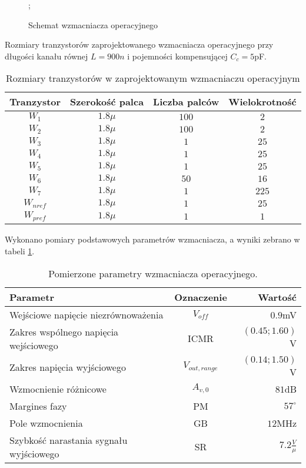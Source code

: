 \documentclass[10pt,a4paper,twoside]{report}
\theoremstyle{definition}
\theoremstyle{definition}
\theoremstyle{definition}
\theoremstyle{definition}
\theoremstyle{definition}
\begin{document}
{{{{{{{\begin{figure}[!htb]
\begin{circuitikz}[scale = 0.6]
			;
			
		\end{circuitikz}
		\caption{Schemat wzmacniacza operacyjnego}
		\label{sch:opamp}
	\end{figure}
	
	
	{	Rozmiary tranzystorów zaprojektowanego wzmacniacza operacyjnego przy długości kanału równej $L=900n$ i pojemności kompensującej $C_c=5$pF. 
	\begin{table}[!ht]
	\begin{center}
	\begin{tabular}{|c|c|c|c|}
		\hline 
		Tranzystor & Szerokość palca & Liczba palców & Wielokrotność \\ 
		\hline 
		$W_1$ & $1.8\mu$ & $100$ & $2$ \\ 
		\hline 
		$W_2$ & $1.8\mu$ & $100$ & $2$ \\ 
		\hline 
		$W_3$ & $1.8\mu$ & $1$ & $25$ \\ 
		\hline 
		$W_4$ & $1.8\mu$ & $1$ & $25$ \\ 
		\hline 
		$W_5$ & $1.8\mu$ & $1$ & $25$ \\ 
		\hline 
		$W_6$ & $1.8\mu$ & $50$ & $16$ \\ 
		\hline 
		$W_7$ & $1.8\mu$ & $1$ & $225$ \\ 
		\hline 
		$W_{nref}$ & $1.8\mu$ & $1$ & $25$ \\ 
		\hline 
		$W_{pref}$ & $1.8\mu$ & $1$ & $1$ \\ 
		\hline 
		\end{tabular} 
	\end{center}
	\caption{Rozmiary tranzystorów w zaprojektowanym wzmacniaczu operacyjnym}
	\end{table}
	}
	
	{	Wykonano pomiary podstawowych parametrów wzmacniacza, a wyniki zebrano w tabeli \ref{tab:opamp}.
	\begin{table}[!ht]
		\begin{center}
			\begin{tabular}{|l|c|r|}
				\hline 
				Parametr & Oznaczenie & Wartość \\ 
				\hline 
				Wejściowe napięcie niezrównoważenia & $V_{off}$ & $0.9$mV \\ 
				\hline 
				Zakres wspólnego napięcia wejściowego & ICMR &$(0.45;1.60)$V\\ 
				\hline 
				Zakres napięcia wyjściowego & $V_{out,range}$ & $ (0.14;1.50)$V \\ 
				\hline 
				Wzmocnienie różnicowe & $A_{v,0}$ & $81$dB \\ 
				\hline 
				Margines fazy & PM & $57^\circ$ \\ 
				\hline 
				Pole wzmocnienia & GB & $12$MHz \\ 
				\hline 
				Szybkość narastania sygnału wyjściowego & SR & $7.2 \frac{V}{\mu} $ \\ 
				\hline 
			\end{tabular} 
		\end{center}
		\caption{Pomierzone parametry wzmacniacza operacyjnego.}
		\label{tab:opamp}
	\end{table}
	
}}}}}}}}
\end{document}
